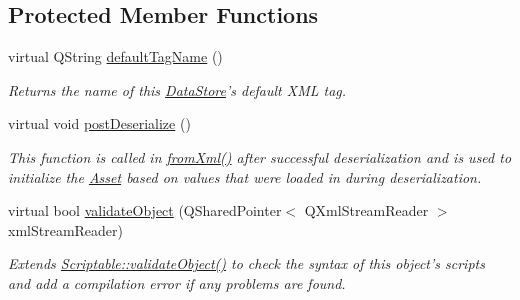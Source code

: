 \subsection*{Protected Member Functions}
\begin{DoxyCompactItemize}
\item 
virtual Q\-String \hyperlink{class_picto_1_1_experiment_a48d8fbffdb96bb5022e0daba4c6dad72}{default\-Tag\-Name} ()
\begin{DoxyCompactList}\small\item\em Returns the name of this \hyperlink{class_picto_1_1_data_store}{Data\-Store}'s default X\-M\-L tag. \end{DoxyCompactList}\item 
virtual void \hyperlink{class_picto_1_1_experiment_a10627698429845c8bd88e3d7b3fa104a}{post\-Deserialize} ()
\begin{DoxyCompactList}\small\item\em This function is called in \hyperlink{class_picto_1_1_asset_a8bed4da09ecb1c07ce0dab313a9aba67}{from\-Xml()} after successful deserialization and is used to initialize the \hyperlink{class_picto_1_1_asset}{Asset} based on values that were loaded in during deserialization. \end{DoxyCompactList}\item 
\hypertarget{class_picto_1_1_experiment_a7005de1c10b50a481b5ca4e6225d5a44}{virtual bool \hyperlink{class_picto_1_1_experiment_a7005de1c10b50a481b5ca4e6225d5a44}{validate\-Object} (Q\-Shared\-Pointer$<$ Q\-Xml\-Stream\-Reader $>$ xml\-Stream\-Reader)}\label{class_picto_1_1_experiment_a7005de1c10b50a481b5ca4e6225d5a44}

\begin{DoxyCompactList}\small\item\em Extends \hyperlink{class_picto_1_1_scriptable_ab6e2944c43a3b5d418bf7b251594386d}{Scriptable\-::validate\-Object()} to check the syntax of this object's scripts and add a compilation error if any problems are found. \end{DoxyCompactList}\end{DoxyCompactItemize}
